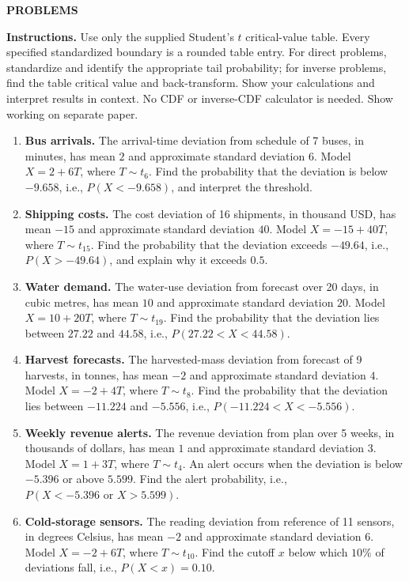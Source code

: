	
	\par\textbf{PROBLEMS}\par
	\par\textbf{Instructions.} Use only the supplied Student's $t$ critical-value table. Every specified standardized boundary is a rounded table entry. For direct problems, standardize and identify the appropriate tail probability; for inverse problems, find the table critical value and back-transform. Show your calculations and interpret results in context. No CDF or inverse-CDF calculator is needed. Show working on separate paper.
	\begin{enumerate}[leftmargin=*,itemsep=12pt,parsep=0pt,topsep=6pt]
		\item \textbf{Bus arrivals.} The arrival-time deviation from schedule of 7 buses, in minutes, has mean $2$ and approximate standard deviation $6$. Model $X=2+6T$, where $T\sim t_{6}$. Find the probability that the deviation is below $-9.658$, i.e., $P(X<-9.658)$, and interpret the threshold.
		\item \textbf{Shipping costs.} The cost deviation of 16 shipments, in thousand USD, has mean $-15$ and approximate standard deviation $40$. Model $X=-15+40T$, where $T\sim t_{15}$. Find the probability that the deviation exceeds $-49.64$, i.e., $P(X>-49.64)$, and explain why it exceeds $0.5$.
		\item \textbf{Water demand.} The water-use deviation from forecast over 20 days, in cubic metres, has mean $10$ and approximate standard deviation $20$. Model $X=10+20T$, where $T\sim t_{19}$. Find the probability that the deviation lies between $27.22$ and $44.58$, i.e., $P(27.22<X<44.58)$.
		\item \textbf{Harvest forecasts.} The harvested-mass deviation from forecast of 9 harvests, in tonnes, has mean $-2$ and approximate standard deviation $4$. Model $X=-2+4T$, where $T\sim t_{8}$. Find the probability that the deviation lies between $-11.224$ and $-5.556$, i.e., $P(-11.224<X<-5.556)$.
		\item \textbf{Weekly revenue alerts.} The revenue deviation from plan over 5 weeks, in thousands of dollars, has mean $1$ and approximate standard deviation $3$. Model $X=1+3T$, where $T\sim t_{4}$. An alert occurs when the deviation is below $-5.396$ or above $5.599$. Find the alert probability, i.e., $P(X<-5.396\text{ or }X>5.599)$.
		\item \textbf{Cold-storage sensors.} The reading deviation from reference of 11 sensors, in degrees Celsius, has mean $-2$ and approximate standard deviation $6$. Model $X=-2+6T$, where $T\sim t_{10}$. Find the cutoff $x$ below which $10\%$ of deviations fall, i.e., $P(X<x)=0.10$.

\end{enumerate}
